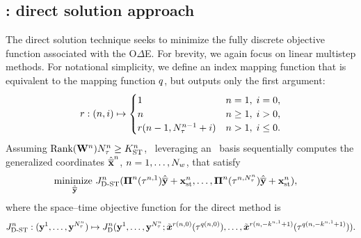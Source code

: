 \subsection{\spaceTimeAcronym: direct solution approach}
The direct solution technique seeks to minimize the fully discrete objective function associated with the O$\Delta$E. For brevity, we again focus on linear multistep methods. For notational simplicity, we define an index mapping function that is 
equivalent to the mapping function $q$, but outputs only the first argument: 
$$r: (n,i) \mapsto 
\begin{cases}
1 & n=1, \; i = 0,\\
n & n \ge 1, \; i > 0, \\
r(n-1,N_{\tau}^{n-1}+i) & n > 1, \; i \le 0.
\end{cases}$$
Assuming $\text{Rank}(\mathbf{W}^{n})N_{\tau}^{n} \ge K_{\text{ST}}^{n}$, \methodAcronym\ leveraging an \spaceTimeAcronym\ basis sequentially computes the generalized coordinates $\hat{\mathbf{\overline{x}}}^{n}$, $n=1,\ldots,N_w$, that satisfy
 \begin{equation}\label{eq:obj_gen_lms_final_st}
\begin{split}
& \underset{\stgenstatey}{\text{minimize } }
\objectiveArgLMS{n}_{\text{D-ST}} (\stbasisArg{n}{\timeWindowArg{n}{1}} \stgenstatey + \stateInterceptSTArg{n},\ldots,\stbasisArg{n}{\timeWindowArg{n}{\nstepsArg{n}}} \stgenstatey + \stateInterceptSTArg{n}),%
\end{split} 
\end{equation}
where the space--time objective function for the direct method is
$$
J^{n}_{\text{D-ST}}  :  (\mathbf{y}^{1},\ldots,\mathbf{y}^{N_{\tau}^{n}}) \mapsto J^{n}_{\text{D}}(\mathbf{y}^{1},\ldots,\mathbf{y}^{N_{\tau}^{n}}; \tilde{\boldsymbol x}^{r(n,0)}(\tau^{q(n,0)}),\ldots, 
 \tilde{\boldsymbol x}^{r(n,-k^{n,1}+1)}(\tau^{q(n,-k^{n,1}+1)})).
$$
